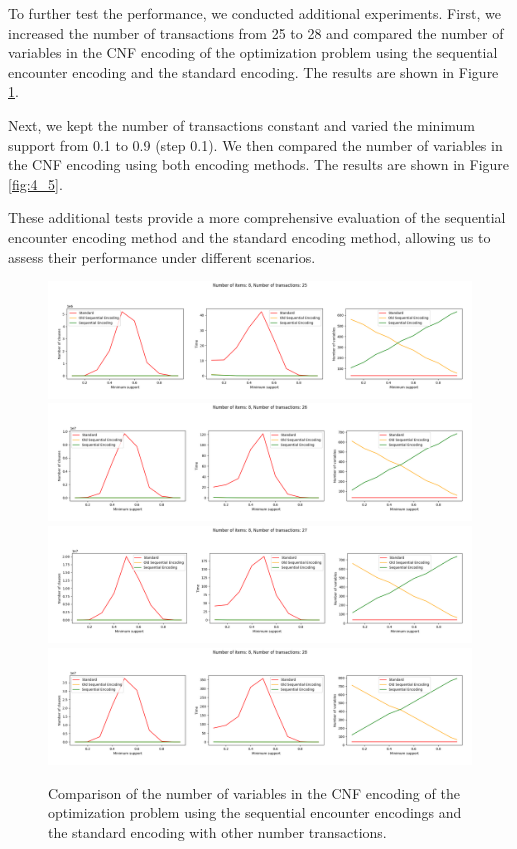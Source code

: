 To further test the performance, we conducted additional experiments. First, we increased the number of transactions from 25 to 28 and compared the number of variables in the CNF encoding of the optimization problem using the sequential encounter encoding and the standard encoding. The results are shown in Figure \ref{fig:4_4}.

Next, we kept the number of transactions constant and varied the minimum support from 0.1 to 0.9 (step 0.1). We then compared the number of variables in the CNF encoding using both encoding methods. The results are shown in Figure \ref{fig:4_5}.

These additional tests provide a more comprehensive evaluation of the sequential encounter encoding method and the standard encoding method, allowing us to assess their performance under different scenarios.

\begin{figure}[H]
    \centering
    \includegraphics[width=1\textwidth]{chapter4/image/n_trans_25.png}
    \includegraphics[width=1\textwidth]{chapter4/image/n_trans_26.png}
    \includegraphics[width=1\textwidth]{chapter4/image/n_trans_27.png}
    \includegraphics[width=1\textwidth]{chapter4/image/n_trans_28.png}
    \caption{Comparison of the number of variables in the CNF encoding of the optimization problem using the sequential encounter encodings and the standard encoding with other number transactions.}
    \label{fig:4_4}
\end{figure}

